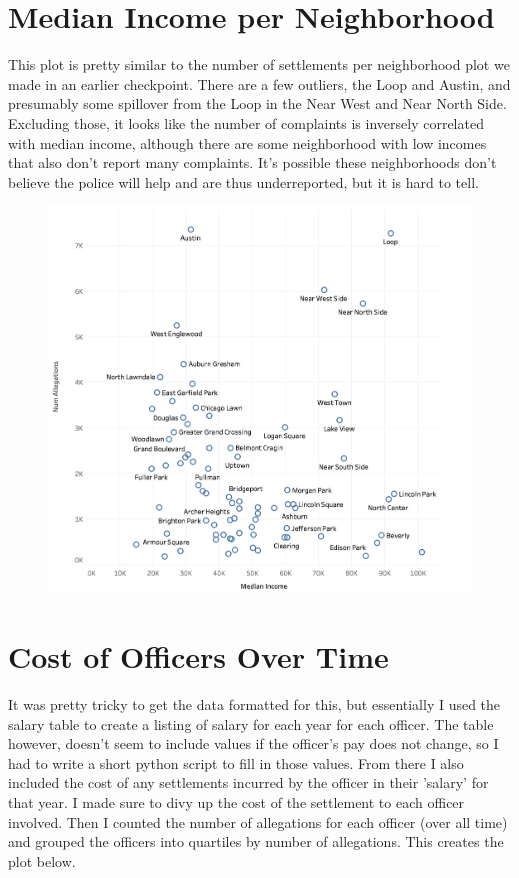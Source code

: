 \documentclass[11pt]{article}
\begin{document}
\FloatBarrier

\section{Median Income per Neighborhood}
This plot is pretty similar to the number of settlements per neighborhood plot we made in an earlier checkpoint. There are a few outliers, the Loop and Austin, and presumably some spillover from the Loop in the Near West and Near North Side. Excluding those, it looks like the number of complaints is inversely correlated with median income, although there are some neighborhood with low incomes that also don't report many complaints. It's possible these neighborhoods don't believe the police will help and are thus underreported, but it is hard to tell.

\begin{figure}[h]
\includegraphics[width=\textwidth]{scatter.png}
\end{figure}

\FloatBarrier

\section{Cost of Officers Over Time}
It was pretty tricky to get the data formatted for this, but essentially I used the salary table to create a listing of salary for each year for each officer. The table however, doesn't seem to include values if the officer's pay does not change, so I had to write a short python script to fill in those values. From there I also included the cost of any settlements incurred by the officer in their 'salary' for that year. I made sure to divy up the cost of the settlement to each officer involved. Then I counted the number of allegations for each officer (over all time) and grouped the officers into quartiles by number of allegations. This creates the plot below.
\end{document}
